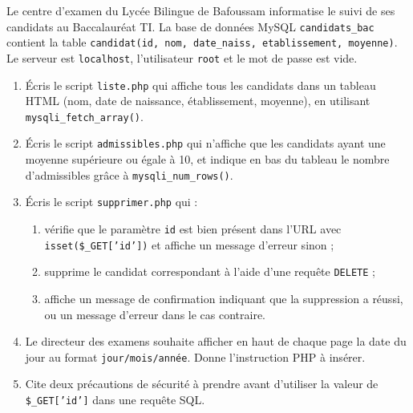 \documentclass[11pt]{article}
\newcounter{popsec}
\newcounter{popsub}
\newcommand{\courssub}[1]{%
  \stepcounter{popsub}%
  \par\vspace{9pt}\noindent{\popxbold\fontsize{11.5}{13}\selectfont\color{popink}{\color{poporange}\thepopsec.\thepopsub}\hspace{6pt}#1}\par\nopagebreak\vspace{4pt}
}
\begin{document}
\courssub{Je me prépare au Bac}

\begin{exercice}
Le centre d'examen du Lycée Bilingue de Bafoussam informatise le suivi de ses candidats au Baccalauréat TI. La base de données MySQL \texttt{candidats\_bac} contient la table \texttt{candidat(id, nom, date\_naiss, etablissement, moyenne)}. Le serveur est \texttt{localhost}, l'utilisateur \texttt{root} et le mot de passe est vide.
\begin{enumerate}
\item Écris le script \texttt{liste.php} qui affiche tous les candidats dans un tableau HTML (nom, date de naissance, établissement, moyenne), en utilisant \texttt{mysqli\_fetch\_array()}.
\item Écris le script \texttt{admissibles.php} qui n'affiche que les candidats ayant une moyenne supérieure ou égale à 10, et indique en bas du tableau le nombre d'admissibles grâce à \texttt{mysqli\_num\_rows()}.
\item Écris le script \texttt{supprimer.php} qui :
\begin{enumerate}
\item[a)] vérifie que le paramètre \texttt{id} est bien présent dans l'URL avec \texttt{isset(\$\_GET['id'])} et affiche un message d'erreur sinon ;
\item[b)] supprime le candidat correspondant à l'aide d'une requête \texttt{DELETE} ;
\item[c)] affiche un message de confirmation indiquant que la suppression a réussi, ou un message d'erreur dans le cas contraire.
\end{enumerate}
\item Le directeur des examens souhaite afficher en haut de chaque page la date du jour au format \texttt{jour/mois/année}. Donne l'instruction PHP à insérer.
\item Cite deux précautions de sécurité à prendre avant d'utiliser la valeur de \texttt{\$\_GET['id']} dans une requête SQL.
\end{enumerate}
\end{exercice}
\end{document}
